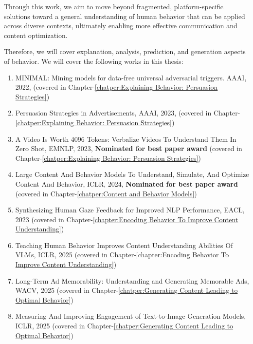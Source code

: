Through this work, we aim to move beyond fragmented, platform-specific solutions toward a general understanding of human behavior that can be applied across diverse contexts, ultimately enabling more effective communication and content optimization.

Therefore, we will cover explanation, analysis, prediction, and generation aspects of behavior. We will cover the following works in this thesis:
\begin{enumerate}
    \item MINIMAL: Mining models for data-free universal adversarial triggers. AAAI, 2022, (covered in Chapter-\ref{chatper:Explaining Behavior: Persuasion Strategies})

    \item Persuasion Strategies in Advertisements, AAAI, 2023, (covered in Chapter-\ref{chatper:Explaining Behavior: Persuasion Strategies})

    \item A Video Is Worth 4096 Tokens: Verbalize Videos To Understand Them In Zero Shot, EMNLP, 2023, \textbf{Nominated for best paper award} (covered in Chapter-\ref{chatper:Explaining Behavior: Persuasion Strategies})

    \item Large Content And Behavior Models To Understand, Simulate, And Optimize Content And Behavior, ICLR, 2024, \textbf{Nominated for best paper award} (covered in Chapter-\ref{chatper:Content and Behavior Models})
    
    \item Synthesizing Human Gaze Feedback for Improved NLP Performance, EACL, 2023 (covered in Chapter-\ref{chapter:Encoding Behavior To Improve Content Understanding})

    \item Teaching Human Behavior Improves Content Understanding Abilities Of VLMs, ICLR, 2025 (covered in Chapter-\ref{chapter:Encoding Behavior To Improve Content Understanding})

    \item Long-Term Ad Memorability: Understanding and Generating Memorable Ads, WACV, 2025 (covered in Chapter-\ref{chatper:Generating Content Leading to Optimal Behavior})

    \item Measuring And Improving Engagement of Text-to-Image Generation Models, ICLR, 2025 (covered in Chapter-\ref{chatper:Generating Content Leading to Optimal Behavior})
\end{enumerate}


